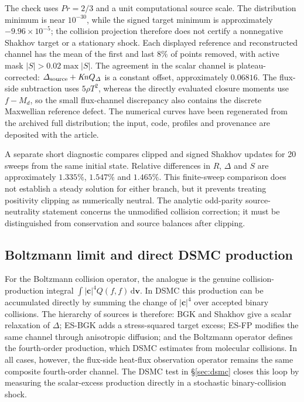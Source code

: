 \documentclass[lineno,paper]{JFM-FLM_Au}
\newenvironment{revision}{\nolinenumbers\begin{tcolorbox}[breakable,colback=revisionyellow,colframe=revisionyellow,boxrule=0pt,arc=0pt,left=5pt,right=5pt,top=5pt,bottom=5pt,before skip=6pt,after skip=6pt]\captionsetup{width=\linewidth}}{\end{tcolorbox}\linenumbers}
\newenvironment{revision}{}{}
\newcommand{\Kn}{\mathit{Kn}}
\newcommand{\dd}{\mathrm{d}}
\begin{document}
\begin{revision}
The check uses $Pr=2/3$ and a unit computational source scale. The distribution minimum is near $10^{-30}$, while the signed target minimum is approximately $-9.96\times10^{-5}$; the collision projection therefore does not certify a nonnegative Shakhov target or a stationary shock. Each displayed reference and reconstructed channel has the mean of the first and last $8\%$ of points removed, with active mask $|S|>0.02\max|S|$. The agreement in the scalar channel is plateau-corrected: $\Delta_{\rm source}+\Kn Q_\Delta$ is a constant offset, approximately $0.06816$. The flux-side subtraction uses $5\rho T^2$, whereas the directly evaluated closure moments use $f-M_d$, so the small flux-channel discrepancy also contains the discrete Maxwellian reference defect. The numerical curves have been regenerated from the archived full distribution; the input, code, profiles and provenance are deposited with the article.
\end{revision}



\begin{revision}
A separate short diagnostic compares clipped and signed Shakhov updates for 20 sweeps from the same initial state. Relative differences in $R$, $\Delta$ and $S$ are approximately $1.335\%$, $1.547\%$ and $1.465\%$. This finite-sweep comparison does not establish a steady solution for either branch, but it prevents treating positivity clipping as numerically neutral. The analytic odd-parity source-neutrality statement concerns the unmodified collision correction; it must be distinguished from conservation and source balances after clipping.
\end{revision}

\subsection{Boltzmann limit and direct DSMC production}
\label{sec:model_ladder_boltzmann}

\begin{revision}
For the Boltzmann collision operator, the analogue is the genuine collision-production integral $\int |\boldsymbol c|^4 Q(f,f)\,\dd\boldsymbol v$.  In DSMC this production can be accumulated directly by summing the change of $|\boldsymbol c|^4$ over accepted binary collisions.  The hierarchy of sources is therefore: BGK and Shakhov give a scalar relaxation of $\Delta$; ES-BGK adds a stress-squared target excess; ES-FP modifies the same channel through anisotropic diffusion; and the Boltzmann operator defines the fourth-order production, which DSMC estimates from molecular collisions.  In all cases, however, the flux-side heat-flux observation operator remains the same composite fourth-order channel.  The DSMC test in \S\ref{sec:dsmc} closes this loop by measuring the scalar-excess production directly in a stochastic binary-collision shock.
\end{revision}
\end{document}
